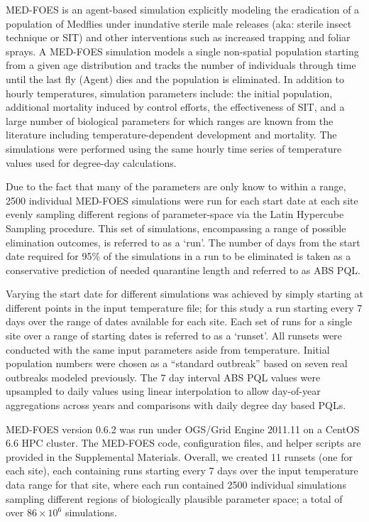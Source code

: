 \documentclass[10pt,a4paper,twocolumn]{article}
\begin{document}
MED-FOES\cite{manoukis_computer_2014,manoukis_agent-based_2014} is 
an agent-based simulation explicitly modeling the eradication of a population of Medflies 
under inundative sterile male releases (aka: sterile insect technique or SIT) and other interventions
such as increased trapping and foliar sprays.
A MED-FOES simulation models a single non-spatial population starting from a given age distribution 
and tracks the number of individuals through time until the last 
fly (Agent) dies and the population is eliminated.
In addition to hourly temperatures, simulation parameters include: 
the initial population, 
additional mortality induced by control efforts,
the effectiveness of SIT, 
and a large number of biological parameters for which ranges are known from 
the literature including temperature-dependent development and mortality.
The simulations were performed using the same hourly time series of temperature values 
used for degree-day calculations.

Due to the fact that many of the parameters are only know to within a range,
2500 individual MED-FOES simulations were run for each start date at each site 
evenly sampling different regions of parameter-space via the 
Latin Hypercube Sampling\cite{10.2307/1403510} procedure.
This set of simulations, encompassing a range of possible elimination outcomes, is referred to as a `run'.
The number of days from the start date required for
95\% of the simulations in a run to be eliminated is 
taken as a conservative prediction of needed quarantine length and referred to as ABS PQL.

Varying the start date for different simulations was achieved by simply 
starting at different points in the input temperature file; 
for this study a run starting every 7 days over the range of dates available for each site.
Each set of runs for a single site over a range of starting dates is referred to as a `runset'.
All runsets were conducted with the same input parameters aside from temperature.
Initial population numbers were chosen as a ``standard outbreak'' based on seven real 
outbreaks modeled previously\cite{manoukis_agent-based_2014}.
The 7 day interval ABS PQL values were upsampled to daily values using linear interpolation
to allow day-of-year aggregations across years and comparisons with daily degree day based PQLs.

MED-FOES version 0.6.2 was run under OGS/Grid Engine 2011.11 on a CentOS 6.6 HPC cluster.
The MED-FOES code, configuration files, and helper scripts are provided in the Supplemental Materials.
Overall, we created 11 runsets (one for each site), 
each containing runs starting every 7 days over the input temperature data range for that site,
where each run contained 2500 individual simulations sampling different regions of 
biologically plausible parameter space; a total of over $86{\times}10^6$ simulations.
\end{document}
